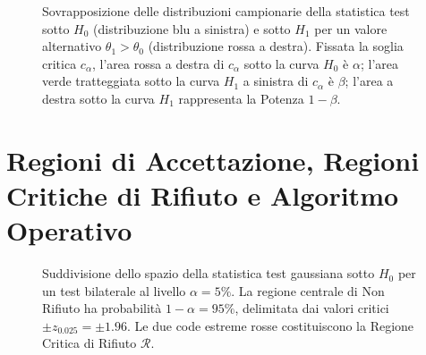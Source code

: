 \begin{figure}[htbp]
    \centering
    
    \caption{Sovrapposizione delle distribuzioni campionarie della statistica test sotto $H_0$ (distribuzione blu a sinistra) e sotto $H_1$ per un valore alternativo $\theta_1 > \theta_0$ (distribuzione rossa a destra). Fissata la soglia critica $c_{\alpha}$, l'area rossa a destra di $c_{\alpha}$ sotto la curva $H_0$ è $\alpha$; l'area verde tratteggiata sotto la curva $H_1$ a sinistra di $c_{\alpha}$ è $\beta$; l'area a destra sotto la curva $H_1$ rappresenta la Potenza $1-\beta$.}
    \label{fig:errori_tipo1_tipo2}
\end{figure}

\section{Regioni di Accettazione, Regioni Critiche di Rifiuto e Algoritmo Operativo}
\label{sec:regioni_rifiuto}

\begin{figure}[htbp]
    \centering
    
    \caption{Suddivisione dello spazio della statistica test gaussiana sotto $H_0$ per un test bilaterale al livello $\alpha = 5\%$. La regione centrale di Non Rifiuto ha probabilità $1-\alpha = 95\%$, delimitata dai valori critici $\pm z_{0.025} = \pm 1.96$. Le due code estreme rosse costituiscono la Regione Critica di Rifiuto $\mathcal{R}$.}
    \label{fig:test_regioni_rifiuto}
\end{figure}

